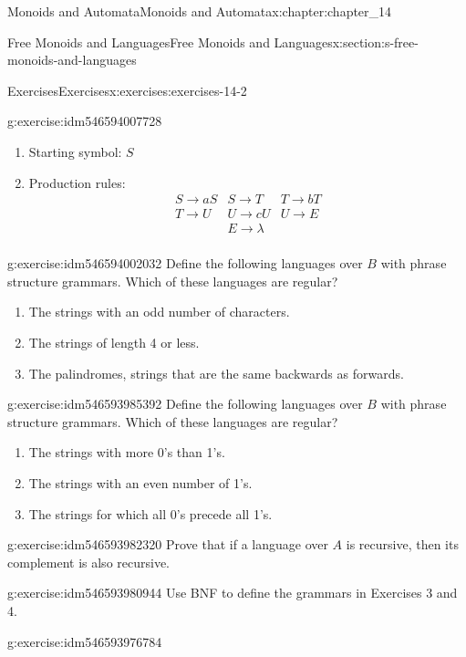 \documentclass[oneside,10pt,]{book}
\numberwithin{equation}{section}
\begin{document}
\begin{chapterptx}{Monoids and Automata}{}{Monoids and Automata}{}{}{x:chapter:chapter_14}
\begin{sectionptx}{Free Monoids and Languages}{}{Free Monoids and Languages}{}{}{x:section:s-free-monoids-and-languages}
\begin{exercises-subsection}{Exercises}{}{Exercises}{}{}{x:exercises:exercises-14-2}
\begin{divisionexercise}{4}{}{}{g:exercise:idm546594007728}
\begin{enumerate}[label=(\alph*)]
\item{}Starting symbol: \(S\)%
\item{}Production rules:%
\begin{equation*}
\begin{array}{ccc}
S\to aS & S \to T & T\to bT\\
T\to U  & U \to cU & U \to E\\
& E\to \lambda &\\
\end{array}
\end{equation*}
%
\end{enumerate}
%
\end{divisionexercise}%
\begin{divisionexercise}{5}{}{}{g:exercise:idm546594002032}%
Define the following languages over \(B\) with phrase structure grammars. Which of these languages are regular?%
\begin{enumerate}[label=(\alph*)]
\item{}The strings with an odd number of characters.%
\item{}The strings of length 4 or less.%
\item{}The palindromes, strings that are the same backwards as forwards.%
\end{enumerate}
%
\end{divisionexercise}%
\begin{divisionexercise}{6}{}{}{g:exercise:idm546593985392}%
Define the following languages over \(B\) with phrase structure grammars. Which of these languages are regular?%
\begin{enumerate}[label=(\alph*)]
\item{}The strings with more 0's than 1's.%
\item{}The strings with an even number of 1's.%
\item{}The strings for which all 0's precede all 1's.%
\end{enumerate}
%
\end{divisionexercise}%
\begin{divisionexercise}{7}{}{}{g:exercise:idm546593982320}%
Prove that if a language over \(A\) is recursive, then its complement is also recursive.%
\end{divisionexercise}%
\begin{divisionexercise}{8}{}{}{g:exercise:idm546593980944}%
Use BNF to define the grammars in Exercises 3 and 4.%
\end{divisionexercise}%
\begin{divisionexercise}{9}{}{}{g:exercise:idm546593976784}%

\end{divisionexercise}
\end{exercises-subsection}
\end{sectionptx}
\end{chapterptx}
\end{document}
